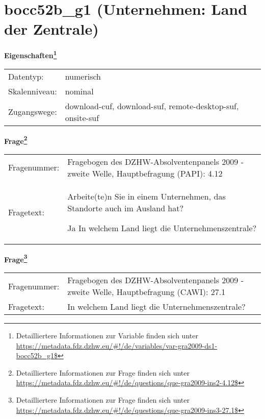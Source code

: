 
    \setcounter{footnote}{0}

    \vspace*{-1.8cm}
	\section{bocc52b\_g1 (Unternehmen: Land der Zentrale)}
	\label{section:bocc52b_g1}



    \vspace*{0.5cm}
    \noindent\textbf{Eigenschaften\footnote{Detailliertere Informationen zur Variable finden sich unter
		\url{https://metadata.fdz.dzhw.eu/\#!/de/variables/var-gra2009-ds1-bocc52b_g1$}}}\\
	\begin{tabularx}{\hsize}{@{}lX}
	Datentyp: & numerisch \\
	Skalenniveau: & nominal \\
	Zugangswege: &
	  download-cuf, 
	  download-suf, 
	  remote-desktop-suf, 
	  onsite-suf
 \\
    \end{tabularx}



				\vspace*{0.5cm}
                \noindent\textbf{Frage\footnote{Detailliertere Informationen zur Frage finden sich unter
		              \url{https://metadata.fdz.dzhw.eu/\#!/de/questions/que-gra2009-ins2-4.12$}}}\\
				\begin{tabularx}{\hsize}{@{}lX}
					Fragenummer: &
					  Fragebogen des DZHW-Absolventenpanels 2009 - zweite Welle, Hauptbefragung (PAPI):
					  4.12
 \\
					Fragetext: & Arbeite(te)n Sie in einem Unternehmen, das Standorte auch im Ausland hat?\par  Ja In welchem Land liegt die Unternehmenszentrale? \\
				\end{tabularx}
				\vspace*{0.5cm}
                \noindent\textbf{Frage\footnote{Detailliertere Informationen zur Frage finden sich unter
		              \url{https://metadata.fdz.dzhw.eu/\#!/de/questions/que-gra2009-ins3-27.1$}}}\\
				\begin{tabularx}{\hsize}{@{}lX}
					Fragenummer: &
					  Fragebogen des DZHW-Absolventenpanels 2009 - zweite Welle, Hauptbefragung (CAWI):
					  27.1
 \\
					Fragetext: & In welchem Land liegt die Unternehmenszentrale? \\
				\end{tabularx}





